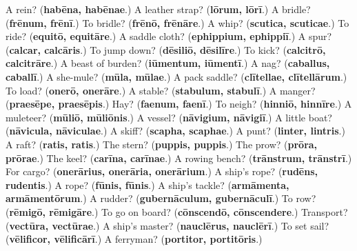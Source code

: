 \begin{tcolorbox}[breakable,colback=teal!4,colframe=teal!35!black,title={Before you move on}]
A rein? (\textbf{habēna, habēnae}.) A leather strap? (\textbf{lōrum, lōrī}.) A bridle? (\textbf{frēnum, frēnī}.) To bridle? (\textbf{frēnō, frēnāre}.) A whip? (\textbf{scutica, scuticae}.) To ride? (\textbf{equitō, equitāre}.) A saddle cloth? (\textbf{ephippium, ephippiī}.) A spur? (\textbf{calcar, calcāris}.) To jump down? (\textbf{dēsiliō, dēsilīre}.) To kick? (\textbf{calcitrō, calcitrāre}.) A beast of burden? (\textbf{iūmentum, iūmentī}.) A nag? (\textbf{caballus, caballī}.) A she-mule? (\textbf{mūla, mūlae}.) A pack saddle? (\textbf{clītellae, clītellārum}.) To load? (\textbf{onerō, onerāre}.) A stable? (\textbf{stabulum, stabulī}.) A manger? (\textbf{praesēpe, praesēpis}.) Hay? (\textbf{faenum, faenī}.) To neigh? (\textbf{hinniō, hinnīre}.) A muleteer? (\textbf{mūliō, mūliōnis}.) A vessel? (\textbf{nāvigium, nāvigiī}.) A little boat? (\textbf{nāvicula, nāviculae}.) A skiff? (\textbf{scapha, scaphae}.) A punt? (\textbf{linter, lintris}.) A raft? (\textbf{ratis, ratis}.) The stern? (\textbf{puppis, puppis}.) The prow? (\textbf{prōra, prōrae}.) The keel? (\textbf{carīna, carīnae}.) A rowing bench? (\textbf{trānstrum, trānstrī}.) For cargo? (\textbf{onerārius, onerāria, onerārium}.) A ship's rope? (\textbf{rudēns, rudentis}.) A rope? (\textbf{fūnis, fūnis}.) A ship's tackle? (\textbf{armāmenta, armāmentōrum}.) A rudder? (\textbf{gubernāculum, gubernāculī}.) To row? (\textbf{rēmigō, rēmigāre}.) To go on board? (\textbf{cōnscendō, cōnscendere}.) Transport? (\textbf{vectūra, vectūrae}.) A ship's master? (\textbf{nauclērus, nauclērī}.) To set sail? (\textbf{vēlificor, vēlificārī}.) A ferryman? (\textbf{portitor, portitōris}.)
\end{tcolorbox}
